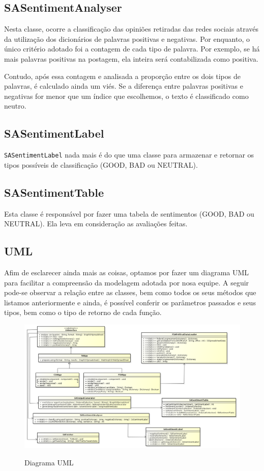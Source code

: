 \subsection{SASentimentAnalyser}
Nesta classe, ocorre a classificação das opiniões retiradas das redes sociais através da utilização dos dicionários de palavras positivas e negativas. Por enquanto, o único critério adotado foi a contagem de cada tipo de palavra. Por exemplo, se há mais palavras positivas na postagem, ela inteira será contabilizada como positiva.

Contudo, após essa contagem e analisada a proporção entre os dois tipos de palavras, é calculado ainda um viés. Se a diferença entre palavras positivas e negativas for menor que um índice que escolhemos, o texto é classificado como neutro.

\subsection{SASentimentLabel}
\texttt{SASentimentLabel} nada mais é do que uma classe para armazenar e retornar os tipos possíveis de classificação (GOOD, BAD ou NEUTRAL).

\subsection{SASentimentTable}
Esta classe é responsável por fazer uma tabela de sentimentos (GOOD, BAD ou NEUTRAL). Ela leva em consideração as avaliações feitas.

\subsection{UML}
Afim de esclarecer ainda mais as coisas, optamos por fazer um diagrama UML para facilitar a compreensão da  modelagem adotada por nosa equipe. A seguir pode-se observar a relação entre as classes, bem como todos os seus métodos que listamos anteriormente e ainda, é possível conferir os parâmetros passados e seus tipos, bem como o tipo de retorno de cada função.

\begin{figure}[h]
\caption{Diagrama UML}
\centering
\includegraphics[width=16cm]{figures/UML.png}
\label{fig:uml}
\end{figure}

